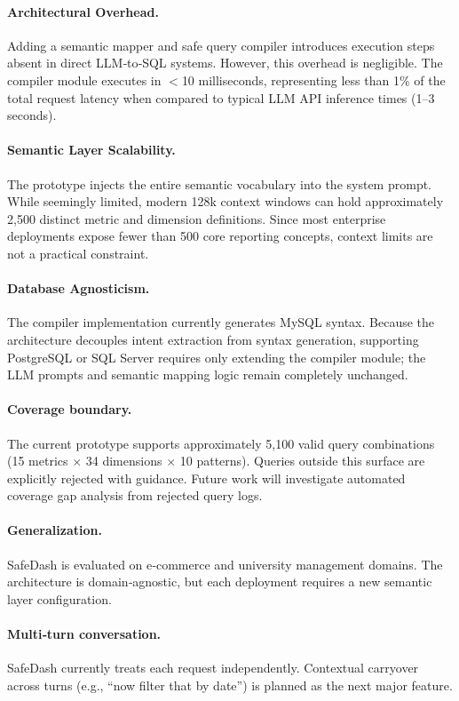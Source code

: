 \documentclass[11pt]{article}
\begin{document}
\paragraph{Architectural Overhead.} Adding a semantic mapper and safe query compiler introduces execution steps absent in direct LLM‑to‑SQL systems. However, this overhead is negligible. The compiler module executes in $<$10 milliseconds, representing less than 1\% of the total request latency when compared to typical LLM API inference times (1–3 seconds).

\paragraph{Semantic Layer Scalability.} The prototype injects the entire semantic vocabulary into the system prompt. While seemingly limited, modern 128k context windows can hold approximately 2,500 distinct metric and dimension definitions. Since most enterprise deployments expose fewer than 500 core reporting concepts, context limits are not a practical constraint.

\paragraph{Database Agnosticism.} The compiler implementation currently generates MySQL syntax. Because the architecture decouples intent extraction from syntax generation, supporting PostgreSQL or SQL Server requires only extending the compiler module; the LLM prompts and semantic mapping logic remain completely unchanged.

\paragraph{Coverage boundary.} The current prototype supports approximately 5,100 valid query combinations (15 metrics $\times$ 34 dimensions $\times$ 10 patterns). Queries outside this surface are explicitly rejected with guidance. Future work will investigate automated coverage gap analysis from rejected query logs.

\paragraph{Generalization.} SafeDash is evaluated on e‑commerce and university management domains. The architecture is domain‑agnostic, but each deployment requires a new semantic layer configuration.

\paragraph{Multi‑turn conversation.} SafeDash currently treats each request independently. Contextual carryover across turns (e.g., ``now filter that by date'') is planned as the next major feature.
\end{document}
